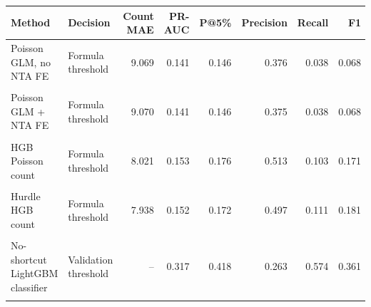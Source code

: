 \begin{tabular}{@{}llrrrrrr@{}}
\toprule
Method & Decision & Count MAE & PR-AUC & P@5\% & Precision & Recall & F1 \\
\midrule
Poisson GLM, no NTA FE & Formula threshold & 9.069 & 0.141 & 0.146 & 0.376 & 0.038 & 0.068 \\\\
Poisson GLM + NTA FE & Formula threshold & 9.070 & 0.141 & 0.146 & 0.375 & 0.038 & 0.068 \\\\
HGB Poisson count & Formula threshold & 8.021 & 0.153 & 0.176 & 0.513 & 0.103 & 0.171 \\\\
Hurdle HGB count & Formula threshold & 7.938 & 0.152 & 0.172 & 0.497 & 0.111 & 0.181 \\\\
No-shortcut LightGBM classifier & Validation threshold & -- & 0.317 & 0.418 & 0.263 & 0.574 & 0.361 \\\\
\bottomrule
\end{tabular}
